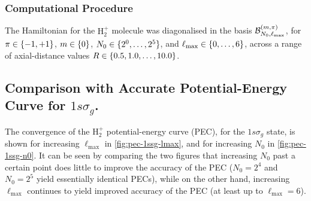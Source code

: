 \documentclass[draft]{article}
\begin{document}
\subsubsection*{Computational Procedure}

The Hamiltonian for the $\mathrm{H}_{2}^{+}$ molecule was diagonalised in the
basis $\mathcal{B}_{N_{0}, \ell_{\max}}^{(m, \pi)}$, for
$\pi \in \lbrace-1, +1\rbrace$, $m \in \lbrace0\rbrace$,
$N_{0} \in \lbrace2^{0}, \dotsc, 2^{5}\rbrace$, and
$\ell_{\max} \in \lbrace0, \dotsc, 6\rbrace$, across a range of axial-distance values
$R \in \lbrace0.5, 1.0, \dotsc, 10.0\rbrace$.

\subsection{Comparison with Accurate Potential-Energy Curve for $1s\sigma_{g}$.}

The convergence of the $\mathrm{H}_{2}^{+}$ potential-energy curve (PEC), for
the $1s\sigma_{g}$ state, is shown for increasing $\ell_{\max}$ in
\autoref{fig:pec-1ssg-lmax}, and for increasing $N_{0}$ in
\autoref{fig:pec-1ssg-n0}.
It can be seen by comparing the two figures that increasing $N_{0}$ past a
certain point does little to improve the accuracy of the PEC ($N_{0} = 2^{4}$
and $N_{0} = 2^{5}$ yield essentially identical PECs), while on the other hand,
increasing $\ell_{\max}$ continues to yield improved accuracy of the PEC (at
least up to $\ell_{\max} = 6$).
\end{document}
